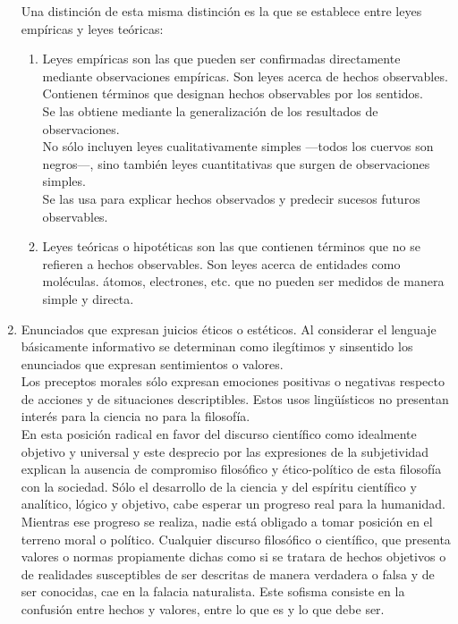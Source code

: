 \documentclass[a4paper, 11pt, twocolumn, spanish]{article}
\begin{document}
\begin{enumerate}
Una distinción de esta misma distinción es la que se establece
entre leyes empíricas y leyes teóricas:
\begin{enumerate}
\item Leyes empíricas son las que pueden ser confirmadas
directamente mediante observaciones empíricas. Son leyes
acerca de hechos observables. Contienen términos que designan
hechos observables por los sentidos.\\[0pt]
Se las obtiene mediante la generalización de los resultados
de observaciones.\\[0pt]
No sólo incluyen leyes cualitativamente simples —todos los
cuervos son negros—, sino también leyes cuantitativas que
surgen de observaciones simples.\\[0pt]
Se las usa para explicar hechos observados y predecir sucesos
futuros observables.
\item Leyes teóricas o hipotéticas son las que contienen términos
que no se refieren a hechos observables. Son leyes acerca de
entidades como moléculas. átomos, electrones, etc. que no
pueden ser medidos de manera simple y directa.
\end{enumerate}

\item Enunciados que expresan juicios éticos o estéticos. Al considerar
el lenguaje básicamente informativo se determinan como ilegítimos
y sinsentido los enunciados que expresan sentimientos o
valores.\\[0pt]
Los preceptos morales sólo expresan emociones positivas o
negativas respecto de acciones y de situaciones
descriptibles. Estos usos lingüísticos no presentan interés para
la ciencia no para la filosofía.\\[0pt]

En esta posición radical en favor del discurso científico como
idealmente objetivo y universal y este desprecio por las
expresiones de la subjetividad explican la ausencia de compromiso
filosófico y ético-político de esta filosofía con la
sociedad. Sólo el desarrollo de la ciencia y del espíritu
científico y analítico, lógico y objetivo, cabe esperar un
progreso real para la humanidad. Mientras ese progreso se
realiza, nadie está obligado a tomar posición en el terreno moral
o político. Cualquier discurso filosófico o científico, que
presenta valores o normas propiamente dichas como si se tratara
de hechos objetivos o de realidades susceptibles de ser descritas
de manera verdadera o falsa y de ser conocidas, cae en la falacia
naturalista. Este sofisma consiste en la confusión entre hechos y
valores, entre lo que es y lo que debe ser.
\end{enumerate}
\end{document}
